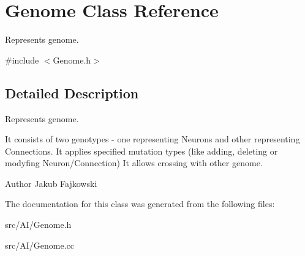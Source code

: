 \hypertarget{classGenome}{}\section{Genome Class Reference}
\label{classGenome}


Represents genome.  




{\ttfamily \#include $<$Genome.\+h$>$}



\subsection{Detailed Description}
Represents genome. 

It consists of two genotypes -\/ one representing Neurons and other representing Connections. It applies specified mutation types (like adding, deleting or modyfing Neuron/\+Connection) It allows crossing with other genome. \begin{DoxyAuthor}{Author}
Jakub Fajkowski 
\end{DoxyAuthor}


The documentation for this class was generated from the following files\+:\begin{DoxyCompactItemize}
\item 
src/\+A\+I/Genome.\+h\item 
src/\+A\+I/Genome.\+cc\end{DoxyCompactItemize}
